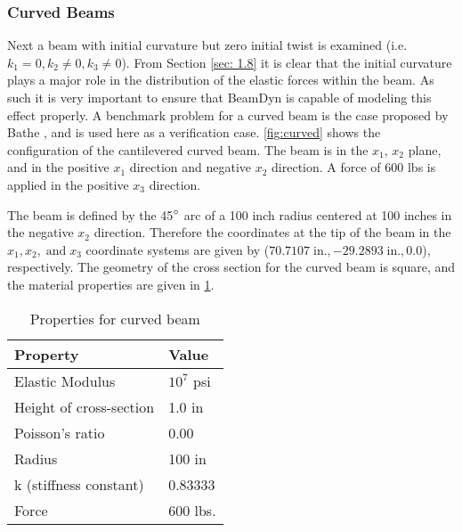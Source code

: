 \documentclass[letterpaper,12pt]{article}
\begin{document}
\subsubsection{Curved Beams}
Next a beam with initial curvature but zero initial twist is examined (i.e.\ $k_1 = 0, k_2 \neq 0, k_3 \neq 0$). From Section \ref{sec: 1.8} it is clear that the initial curvature plays a major role in the distribution of the elastic forces within the beam. As such it is very important to ensure that BeamDyn is capable of modeling this effect properly. A benchmark problem for a curved beam is the case proposed by Bathe \cite{bathe1979large}, and is used here as a verification case. \ref{fig:curved} shows the configuration of the cantilevered curved beam. The beam is in the $x_1$, $x_2$ plane, and in the positive $x_1$ direction and negative $x_2$ direction. A force of 600 lbs is applied in the positive $x_3$ direction. 


The beam is defined by the 45$\degree$ arc of a 100 inch radius centered at 100 inches in the negative $x_2$ direction. Therefore the coordinates at the tip of the beam in the $x_1, x_2,\; \mbox{and}\; x_3$ coordinate systems are given by ($
70.7107\; \mbox{in.}, -29.2893\; \mbox{in.}, 0.0$), respectively. The geometry of the cross section for the curved beam is square, and the material properties are given in \ref{tab:curve}. 
\begin{table}
\caption{\label{tab:curve} Properties for curved beam}
\begin{center}
    \begin{tabular}{| l | l |}
    	\hline
    	Property               & Value              \\ \hline
    	Elastic Modulus                      & $10^7$ psi   \\ \hline
    	Height of cross-section                      & 1.0 in                \\ \hline
    	Poisson's ratio                  & 0.00               \\ \hline
    	Radius                      & 100 in                 \\ \hline
    	k (stiffness constant) & 0.83333               \\ \hline
    	    	Force & 600 lbs.               \\ \hline
    \end{tabular}
\end{center}
\end{table}
\end{document}
